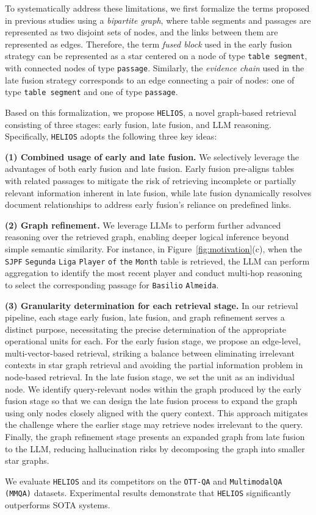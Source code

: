 To systematically address these limitations, we first formalize the terms proposed in previous studies using a \emph{bipartite graph}, where table segments and passages are represented as two disjoint sets of nodes, and the links between them are represented as edges. 
Therefore, the term \emph{fused block} used in the early fusion strategy \citep{OTT-QA, OTTeR, DoTTeR} can be represented as a star \citep{GraphTheory} centered on a node of type \texttt{table segment}, with connected nodes of type \texttt{passage}. 
Similarly, the \emph{evidence chain} used in the late fusion strategy \citep{CORE, COS} corresponds to an edge connecting a pair of nodes: one of type \texttt{table segment} and one of type \texttt{passage}.

Based on this formalization, we propose \texttt{HELIOS}, a novel graph-based retrieval consisting of three stages: early fusion, late fusion, and LLM reasoning. 
Specifically, \texttt{HELIOS} adopts the following three key ideas:

\textbf{(1) Combined usage of early and late fusion.}
We selectively leverage the advantages of both early fusion and late fusion. 
Early fusion pre-aligns tables with related passages to mitigate the risk of retrieving incomplete or partially relevant information inherent in late fusion, while late fusion dynamically resolves document relationships to address early fusion's reliance on predefined links.

\vspace{-1mm}
\textbf{(2) Graph refinement.} 
We leverage LLMs to perform further advanced reasoning over the retrieved graph, enabling deeper logical inference beyond simple semantic similarity.
For instance, in Figure~\ref{fig:motivation}(c), when the \texttt{SJPF} \texttt{Segunda} \texttt{Liga} \texttt{Player} \texttt{of} \texttt{the} \texttt{Month} table is retrieved, the LLM can perform aggregation to identify the most recent player and conduct multi-hop reasoning to select the corresponding passage for \texttt{Basilio} \texttt{Almeida}.

\textbf{(3) Granularity determination for each retrieval stage.}
In our retrieval pipeline, each stage early fusion, late fusion, and graph refinement serves a distinct purpose, necessitating the precise determination of the appropriate operational units for each.
For the early fusion stage, we propose an {\editcolor edge-level, multi-vector-based retrieval}, striking a balance between eliminating irrelevant contexts in star graph retrieval and avoiding the partial information problem in node-based retrieval.
In the late fusion stage, we set the unit as an individual node.
We identify query-relevant nodes within the graph produced by the early fusion stage so that we can design the late fusion process to expand the graph using only nodes closely aligned with the query context.
This approach mitigates the challenge where the earlier stage may retrieve nodes irrelevant to the query.
Finally, the graph refinement stage presents an expanded graph from late fusion to the LLM, reducing hallucination risks by decomposing the graph into smaller star graphs.

{\feditcolor
We evaluate \texttt{HELIOS} and its competitors on the \texttt{OTT-QA} \citep{OTT-QA} and \texttt{MultimodalQA (MMQA)} \citep{MultiModalQA} datasets.
}
Experimental results demonstrate that \texttt{HELIOS} significantly outperforms SOTA systems.